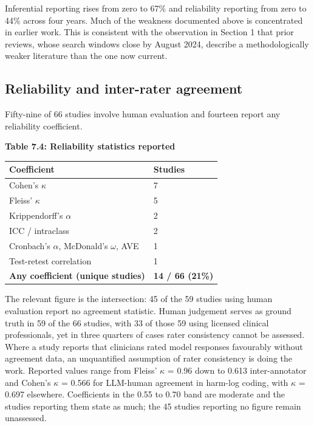\documentclass[11pt]{article}
\begin{document}
	Inferential reporting rises from zero to 67\% and reliability reporting from zero to 44\% across four years. Much of the weakness documented above is concentrated in earlier work. This is consistent with the observation in Section 1 that prior reviews, whose search windows close by August 2024, describe a methodologically weaker literature than the one now current.
	
	\subsection{Reliability and inter-rater agreement}
	
	Fifty-nine of 66 studies involve human evaluation and fourteen report any reliability coefficient.
	
	\begin{center}
		\textbf{Table 7.4: Reliability statistics reported}
		\vspace{2pt}
		
		\footnotesize
		\setlength{\tabcolsep}{3pt}\renewcommand{\arraystretch}{1.1}
		\begin{tabularx}{\textwidth}{|X|X|}
			\hline
			\textbf{Coefficient} & \textbf{Studies} \\
			\hline
			Cohen's $\kappa$ & 7 \\
			\hline
			Fleiss' $\kappa$ & 5 \\
			\hline
			Krippendorff's $\alpha$ & 2 \\
			\hline
			ICC / intraclass & 2 \\
			\hline
			Cronbach's $\alpha$, McDonald's $\omega$, AVE & 1 \\
			\hline
			Test-retest correlation & 1 \\
			\hline
			\textbf{Any coefficient (unique studies)} & \textbf{14 / 66 (21\%)} \\
			\hline
		\end{tabularx}
	\end{center}
	
	The relevant figure is the intersection: 45 of the 59 studies using human evaluation report no agreement statistic. Human judgement serves as ground truth in 59 of the 66 studies, with 33 of those 59 using licensed clinical professionals, yet in three quarters of cases rater consistency cannot be assessed. Where a study reports that clinicians rated model responses favourably without agreement data, an unquantified assumption of rater consistency is doing the work. Reported values range from Fleiss' $\kappa$ = 0.96 down to 0.613 inter-annotator and Cohen's $\kappa$ = 0.566 for LLM-human agreement in harm-log coding\cite{moore2026characterizingdelusionalspiralshumanllm}, with $\kappa$ = 0.697 elsewhere. Coefficients in the 0.55 to 0.70 band are moderate and the studies reporting them state as much; the 45 studies reporting no figure remain unassessed.
	
\end{document}
